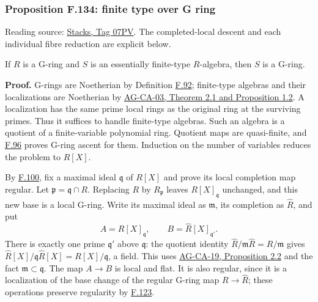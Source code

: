 \documentclass[11pt,a4paper,openany]{report}
\begin{document}
\label{AG-RG-S05-more-algebra-proposition-finite-type-over-G-ring}

\subsubsection{Proposition F.134: finite type over G ring}\label{AG-RG-S05-proposition-f.134-finite-type-over-g-ring}

Reading source: \href{https://stacks.math.columbia.edu/tag/07PV}{Stacks, Tag 07PV}. The completed-local descent and each individual fibre reduction are explicit below.

If \(R\) is a G-ring and \(S\) is an essentially finite-type \(R\)-algebra, then \(S\) is a G-ring.

\textbf{Proof.} G-rings are Noetherian by Definition \hyperref[AG-RG-S05-more-algebra-definition-G-ring]{F.92}; finite-type algebras and their localizations are Noetherian by \href{https://github.com/KokunoYumeto/open-math-courses/blob/d02d0a3669f42579db037cd44de1d113fdd770a1/docs/courses/AG-CA/src/noetherian-and-artinian-rings.md}{AG-CA-03, Theorem 2.1 and Proposition 1.2}. A localization has the same prime local rings as the original ring at the surviving primes. Thus it suffices to handle finite-type algebras. Such an algebra is a quotient of a finite-variable polynomial ring. Quotient maps are quasi-finite, and \hyperref[AG-RG-S05-more-algebra-lemma-G-ring-goes-up-quasi-finite]{F.96} proves G-ring ascent for them. Induction on the number of variables reduces the problem to \(R[X]\).

By \hyperref[AG-RG-S05-more-algebra-lemma-check-G-ring-maximal-ideals]{F.100}, fix a maximal ideal \(\mathfrak q\) of \(R[X]\) and prove its local completion map regular. Let \(\mathfrak p=\mathfrak q\cap R\). Replacing \(R\) by \(R_{\mathfrak p}\) leaves \(R[X]_{\mathfrak q}\) unchanged, and this new base is a local G-ring. Write its maximal ideal as \(\mathfrak m\), its completion as \(\widehat R\), and put \[A=R[X]_{\mathfrak q},\qquad B=\widehat R[X]_{\mathfrak q'}.\] There is exactly one prime \(\mathfrak q'\) above \(\mathfrak q\): the quotient identity \(\widehat R/\mathfrak m\widehat R=R/\mathfrak m\) gives \(\widehat R[X]/\mathfrak q\widehat R[X]=R[X]/\mathfrak q\), a field. This uses \href{https://github.com/KokunoYumeto/open-math-courses/blob/d02d0a3669f42579db037cd44de1d113fdd770a1/docs/courses/AG-CA/src/completion.md}{AG-CA-19, Proposition 2.2} and the fact \(\mathfrak m\subset\mathfrak q\). The map \(A\to B\) is local and flat. It is also regular, since it is a localization of the base change of the regular G-ring map \(R\to\widehat R\); these operations preserve regularity by \hyperref[AG-RG-S05-more-algebra-lemma-regular-base-change]{F.123}.
\end{document}
